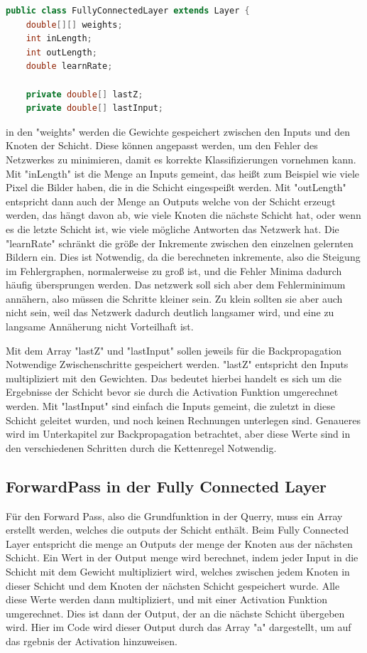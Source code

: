 \documentclass[12pt]{article}
\begin{document}
\begin{lstlisting}[language=Java]
public class FullyConnectedLayer extends Layer {
    double[][] weights;
    int inLength;
    int outLength;
    double learnRate;

    private double[] lastZ;
    private double[] lastInput;
\end{lstlisting} 
in den "weights" werden die Gewichte gespeichert zwischen den Inputs und den Knoten der Schicht. Diese können angepasst werden, um den Fehler des Netzwerkes zu minimieren, damit es korrekte Klassifizierungen vornehmen kann.
Mit "inLength" ist die Menge an Inputs gemeint, das heißt zum Beispiel wie viele Pixel die Bilder haben, die in die Schicht eingespeißt werden.
Mit "outLength" entspricht dann auch der Menge an Outputs welche von der Schicht erzeugt werden, das hängt davon ab, wie viele Knoten die nächste Schicht hat, oder wenn es die letzte Schicht ist, wie viele mögliche Antworten das Netzwerk hat.
Die "learnRate" schränkt die größe der Inkremente zwischen den einzelnen gelernten Bildern ein. Dies ist Notwendig, da die berechneten inkremente, also die Steigung im Fehlergraphen, normalerweise zu groß ist, und die Fehler Minima dadurch häufig übersprungen werden. Das netzwerk soll sich aber dem Fehlerminimum annähern, also müssen die Schritte kleiner sein. Zu klein sollten sie aber auch nicht sein, weil das Netzwerk dadurch deutlich langsamer wird, und eine zu langsame Annäherung nicht Vorteilhaft ist.


Mit dem Array "lastZ" und "lastInput" sollen jeweils für die Backpropagation Notwendige Zwischenschritte gespeichert werden. "lastZ" entspricht den Inputs multipliziert mit den Gewichten. Das bedeutet hierbei handelt es sich um die Ergebnisse der Schicht bevor sie durch die Activation Funktion umgerechnet werden. Mit "lastInput" sind einfach die Inputs gemeint, die zuletzt in diese Schicht geleitet wurden, und noch keinen Rechnungen unterlegen sind. Genaueres wird im Unterkapitel zur Backpropagation betrachtet, aber diese Werte sind in den verschiedenen Schritten durch die Kettenregel Notwendig.


\subsection{ForwardPass in der Fully Connected Layer}

Für den Forward Pass, also die Grundfunktion in der Querry, muss ein Array erstellt werden, welches die outputs der Schicht enthält. Beim Fully Connected Layer entspricht die menge an Outputs der menge der Knoten aus der nächsten Schicht. Ein Wert in der Output menge wird berechnet, indem jeder Input in die Schicht mit dem Gewicht multipliziert wird, welches zwischen jedem Knoten in dieser Schicht und dem Knoten der nächsten Schicht gespeichert wurde. Alle diese Werte werden dann multipliziert, und mit einer Activation Funktion umgerechnet. Dies ist dann der Output, der an die nächste Schicht übergeben wird. Hier im Code wird dieser Output durch das Array "a" dargestellt, um auf das rgebnis der Activation hinzuweisen.
\end{document}
